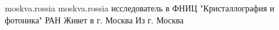  
 
 
 
 

\par
moskva.rossia
moskva.rossia
исследователь в ФНИЦ "Кристаллография и фотоника" РАН
Живет в г. Москва
Из г. Москва

